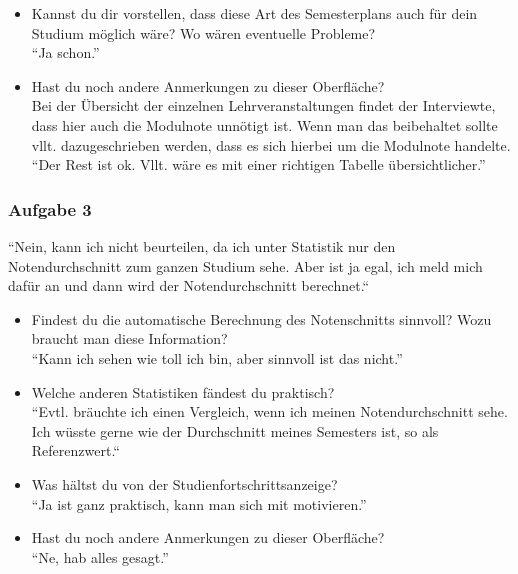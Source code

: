 \documentclass[a4paper,10pt]{scrartcl}
\begin{document}
\begin{itemize}
\item  Kannst du dir vorstellen, dass diese Art des Semesterplans auch für dein Studium
möglich wäre? Wo wären eventuelle Probleme? \\

``Ja schon.''


\item  Hast du noch andere Anmerkungen zu dieser Oberfläche? \\

Bei der Übersicht der einzelnen Lehrveranstaltungen findet der Interviewte, dass hier auch die Modulnote unnötigt ist. Wenn man das beibehaltet sollte vllt. dazugeschrieben werden, dass es sich hierbei um die Modulnote handelte. 
``Der Rest ist ok. Vllt. wäre es mit einer richtigen Tabelle übersichtlicher.''

\end{itemize}

\subsubsection*{Aufgabe 3}

``Nein, kann ich nicht beurteilen, da ich unter Statistik nur den Notendurchschnitt zum ganzen Studium sehe. Aber ist ja egal, ich meld mich dafür an und dann wird der Notendurchschnitt berechnet.``

\begin{itemize}

\item Findest du die automatische Berechnung des Notenschnitts sinnvoll? Wozu braucht man diese Information? \\
``Kann ich sehen wie toll ich bin, aber sinnvoll ist das nicht.''

\item  Welche anderen Statistiken fändest du praktisch? \\

``Evtl. bräuchte ich einen Vergleich, wenn ich meinen Notendurchschnitt sehe. Ich wüsste gerne wie der Durchschnitt meines Semesters ist, so als Referenzwert.``


\item  Was hältst du von der Studienfortschrittsanzeige? \\

``Ja ist ganz praktisch, kann man sich mit motivieren.''


\item  Hast du noch andere Anmerkungen zu dieser Oberfläche?  \\

``Ne, hab alles gesagt.''

\end{itemize}
\end{document}
